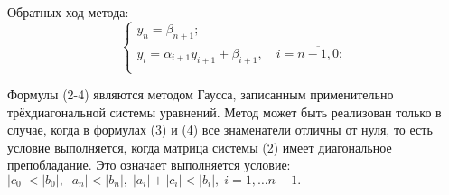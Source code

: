 \documentclass[a4paper,12pt]{article}
\begin{document}
{Обратных ход метода:
\begin{equation}
    \begin{cases}
        y_n = \beta_{n+1};\\
        y_i = \alpha_{i+1}y_{i+1} + \beta_{i+1}, \quad i = \overline{n-1, 0};\\
    \end{cases}
\end{equation}

Формулы (2-4) являются методом Гаусса, записанным применительно трёх\-диаго\-наль\-ной системы уравнений. 
Метод может быть реализован только в случае, когда в формулах (3) и (4) все знаменатели отличны от нуля, 
то есть условие выполняется, когда матрица системы (2) имеет диагональное препобладание.
Это означает выполняется условие:\\$|c_0| < |b_0|,\;|a_n|<|b_n|,\;|a_i| + |c_i| < |b_i|,\;i = 1,\dots n-1.$

}
\end{document}
